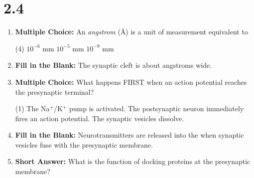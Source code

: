 \section*{2.4}
\begin{enumerate}[label=\textbf{Q2.4.\arabic*}]
      
      \item \textbf{Multiple Choice:} An \textit{angstrom} (\AA) is a unit of measurement equivalent to
      \begin{tasks}[label=\textcolor{draculafg}{(\Alph*)}, item-format=\color{draculafg}, label-width=1.5em, item-indent=1.7em](4)
            \task \(10^{-6}\) mm
            \task \(10^{-5}\) mm
            \task {}
            \task \(10^{-9}\) mm
      \end{tasks}
      
      \item \textbf{Fill in the Blank:} The synaptic cleft is about \cyanit{20 \AA} angstroms wide. \\

      \item \textbf{Multiple Choice:} What happens FIRST when an action potential reaches the presynaptic terminal?
            \begin{tasks}[label=\textcolor{draculafg}{(\Alph*)}, item-format=\color{draculafg}, label-width=1.5em, item-indent=1.7em](1)
                  \task The Na\(^+\)/K\(^+\) pump is activated.
                  \task The postsynaptic neuron immediately fires an action potential.
                  \task {}
                  \task The synaptic vesicles dissolve.
            \end{tasks}

      \item \textbf{Fill in the Blank:} Neurotransmitters are released into the  when synaptic vesicles fuse with the presynaptic membrane. \\

      \item \textbf{Short Answer:} What is the function of docking proteins at the presynaptic membrane? \\

            
            

\end{enumerate}

